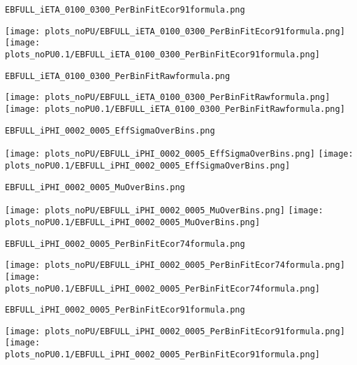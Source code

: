 \begin{frame}[fragile]
\begin{verbatim}
EBFULL_iETA_0100_0300_PerBinFitEcor91formula.png
\end{verbatim}
\texttt{[image: plots\_noPU/EBFULL\_iETA\_0100\_0300\_PerBinFitEcor91formula.png]}
\texttt{[image: plots\_noPU0.1/EBFULL\_iETA\_0100\_0300\_PerBinFitEcor91formula.png]}
\end{frame}
\begin{frame}[fragile]
\begin{verbatim}
EBFULL_iETA_0100_0300_PerBinFitRawformula.png
\end{verbatim}
\texttt{[image: plots\_noPU/EBFULL\_iETA\_0100\_0300\_PerBinFitRawformula.png]}
\texttt{[image: plots\_noPU0.1/EBFULL\_iETA\_0100\_0300\_PerBinFitRawformula.png]}
\end{frame}
\begin{frame}[fragile]
\begin{verbatim}
EBFULL_iPHI_0002_0005_EffSigmaOverBins.png
\end{verbatim}
\texttt{[image: plots\_noPU/EBFULL\_iPHI\_0002\_0005\_EffSigmaOverBins.png]}
\texttt{[image: plots\_noPU0.1/EBFULL\_iPHI\_0002\_0005\_EffSigmaOverBins.png]}
\end{frame}
\begin{frame}[fragile]
\begin{verbatim}
EBFULL_iPHI_0002_0005_MuOverBins.png
\end{verbatim}
\texttt{[image: plots\_noPU/EBFULL\_iPHI\_0002\_0005\_MuOverBins.png]}
\texttt{[image: plots\_noPU0.1/EBFULL\_iPHI\_0002\_0005\_MuOverBins.png]}
\end{frame}
\begin{frame}[fragile]
\begin{verbatim}
EBFULL_iPHI_0002_0005_PerBinFitEcor74formula.png
\end{verbatim}
\texttt{[image: plots\_noPU/EBFULL\_iPHI\_0002\_0005\_PerBinFitEcor74formula.png]}
\texttt{[image: plots\_noPU0.1/EBFULL\_iPHI\_0002\_0005\_PerBinFitEcor74formula.png]}
\end{frame}
\begin{frame}[fragile]
\begin{verbatim}
EBFULL_iPHI_0002_0005_PerBinFitEcor91formula.png
\end{verbatim}
\texttt{[image: plots\_noPU/EBFULL\_iPHI\_0002\_0005\_PerBinFitEcor91formula.png]}
\texttt{[image: plots\_noPU0.1/EBFULL\_iPHI\_0002\_0005\_PerBinFitEcor91formula.png]}
\end{frame}
